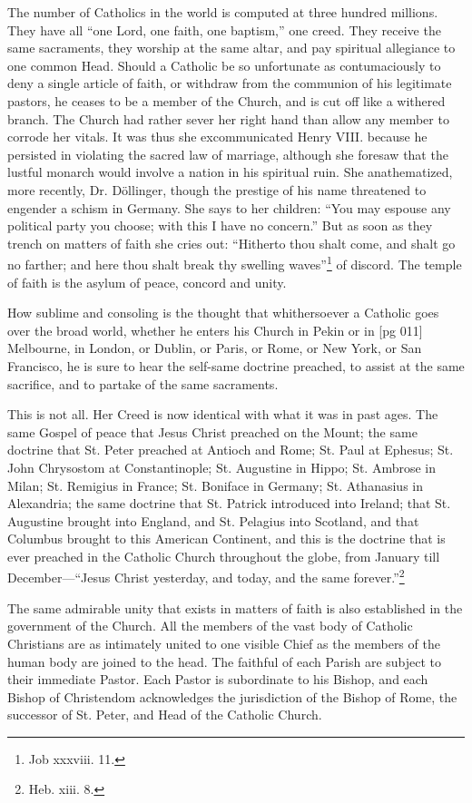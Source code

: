 The number of Catholics in the world is computed
at three hundred millions. They have
all “one Lord, one faith, one baptism,” one
creed. They receive the same sacraments, they
worship at the same altar, and pay spiritual allegiance
to one common Head. Should a Catholic
be so unfortunate as contumaciously to deny a
single article of faith, or withdraw from the communion
of his legitimate pastors, he ceases to be a
member of the Church, and is cut off like a
withered branch. The Church had rather sever
her right hand than allow any member to corrode
her vitals. It was thus she excommunicated Henry
VIII. because he persisted in violating the sacred
law of marriage, although she foresaw that the
lustful monarch would involve a nation in his
spiritual ruin. She anathematized, more recently,
Dr. Döllinger, though the prestige of his name
threatened to engender a schism in Germany. She
says to her children: “You may espouse any
political party you choose; with this I have no concern.”
But as soon as they trench on matters of
faith she cries out: “Hitherto thou shalt come,
and shalt go no farther; and here thou shalt break
thy swelling waves”\footnote{Job xxxviii.
11.} of discord. The temple of
faith is the asylum of peace, concord and unity.

How sublime and consoling is the thought that
whithersoever a Catholic goes over the broad
world, whether he enters his Church in Pekin or in
[pg 011]
Melbourne, in London, or Dublin, or Paris, or
Rome, or New York, or San Francisco, he is sure
to hear the self-same doctrine preached, to assist
at the same sacrifice, and to partake of the same
sacraments.

This is not all. Her Creed is now identical with
what it was in past ages. The same Gospel of
peace that Jesus Christ preached on the Mount;
the same doctrine that St. Peter preached at Antioch
and Rome; St. Paul at Ephesus; St. John
Chrysostom at Constantinople; St. Augustine in
Hippo; St. Ambrose in Milan; St. Remigius in
France; St. Boniface in Germany; St. Athanasius
in Alexandria; the same doctrine that St. Patrick
introduced into Ireland; that St. Augustine
brought into England, and St. Pelagius into Scotland,
and that Columbus brought to this American
Continent, and this is the doctrine that is ever
preached in the Catholic Church throughout the
globe, from January till December—“Jesus Christ
yesterday, and today, and the same forever.”\footnote{Heb. xiii. 8.}

The same admirable unity that exists in matters
of faith is also established in the government of
the Church. All the members of the vast body of
Catholic Christians are as intimately united to one
visible Chief as the members of the human body
are joined to the head. The faithful of each Parish
are subject to their immediate Pastor. Each Pastor
is subordinate to his Bishop, and each Bishop
of Christendom acknowledges the jurisdiction of
the Bishop of Rome, the successor of St. Peter,
and Head of the Catholic Church.

